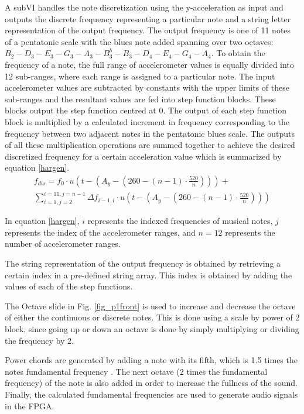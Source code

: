 A subVI handles the note discretization using the y-acceleration as input and outputs the discrete frequency representing a particular note and a string letter representation of the output frequency.
 The output frequency is one of 11 notes of a pentatonic scale with the blues note added spanning over two octaves: \(B_{2} - D_{3} - E_{3} - G_{3} - A_{3} - B^{b}_{3} - B_{3} - D_{4} - E_{4} - G_{4} - A_{4}\).
 To obtain the frequency of a note, the full range of accelerometer values is equally divided into 12 sub-ranges, where each range is assigned to a particular note.
 The input accelerometer values are subtracted by constants with the upper limits of these sub-ranges and the resultant values are fed into step function blocks.
 These blocks output the step function centred at 0.
 The output of each step function block is multiplied by a calculated increment in frequency corresponding to the frequency between two adjacent notes in the pentatonic blues scale.
 The outputs of all these multiplication operations are summed together to achieve the desired discretized frequency for a certain acceleration value which is summarized by equation \ref{hargen}. 
\begin{equation}
\label{hargen}
\begin{split}
 f_{dis}=f_{0}\cdot u \left( t- \left( A_{y}- \left( 260- \left( n-1  \right) \cdot \frac{520}{n} \right) \right) \right) +\\ \sum_{i=1, j=2}^{i=11,j=n-1}\Delta f_{i-1,i} \cdot u\left (t-\left (A_{y}-\left (260- \left( n-1  \right) \cdot \frac{520}{n}  \right) \right) \right)
\end{split}
\end{equation}

In equation \ref{hargen}, $i$ represents the indexed frequencies of musical notes, $j$ represents the index of the accelerometer ranges, and $n = 12$ represents the number of accelerometer ranges.

The string representation of the output frequency is obtained by retrieving a certain index in a pre-defined string array.
 This index is obtained by adding the values of each of the step functions.

The Octave slide in Fig. \ref{fig_p1front} is used to increase and decrease the octave of either the continuous or discrete notes.
 This is done using a scale by power of 2 block, since going up or down an octave is done by simply multiplying or dividing the frequency by 2.

Power chords are generated by adding a note with its fifth, which is 1.5 times the notes fundamental frequency \cite{power_chords}.
 The next octave (2 times the fundamental frequency) of the note is also added in order to increase the fullness of the sound.
 Finally, the calculated fundamental frequencies are used to generate audio signals in the FPGA.

